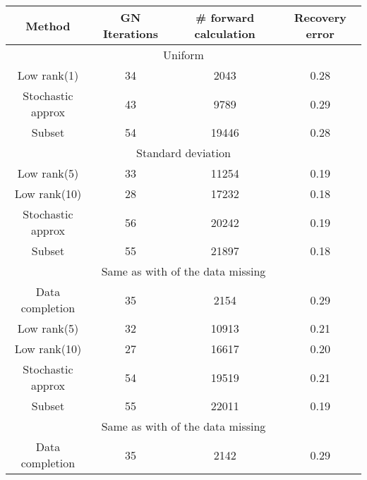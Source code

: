 \documentclass[12pt]{article}
\begin{document}
\begin{table}
\begin{center}
\begin{tabular}{|cccc|}
\hline
Method                     & GN Iterations & \# forward calculation & Recovery error \\
\hline
\multicolumn{4}{|c|}{ Uniform } \\
\hline
Low rank(1)            &         34                   &              2043                       &        0.28       \\
Stochastic approx  &         43                  &             9789                        &        0.29      \\
Subset                      &        54                   &            19446                        &       0.28        \\
\hline
\multicolumn{4}{|c|}{Standard deviation } \\
\hline
Low rank(5)            &         33            &              11254                   &        0.19       \\
Low rank(10)          &         28           &              17232                    &        0.18       \\
Stochastic approx  &       56             &             20242                    &      0.19         \\
Subset                     &       55            &              21897                    &       0.18        \\
\hline
\multicolumn{4}{|c|}{Same as  with  of the data missing} \\
\hline
Data completion    &       35                &             2154                        &     0.29          \\
Low rank(5)            &        32            &              10913                   &        0.21       \\
Low rank(10)          &         27           &              16617                    &        0.20       \\
Stochastic approx  &       54             &             19519                    &      0.21         \\
Subset                     &       55            &              22011                    &       0.19        \\
\hline
\multicolumn{4}{|c|}{Same as  with  of the data missing} \\
\hline
Data completion    &       35                &             2142                        &     0.29          \\

\end{tabular}
\end{center}
\end{table}
\end{document}
